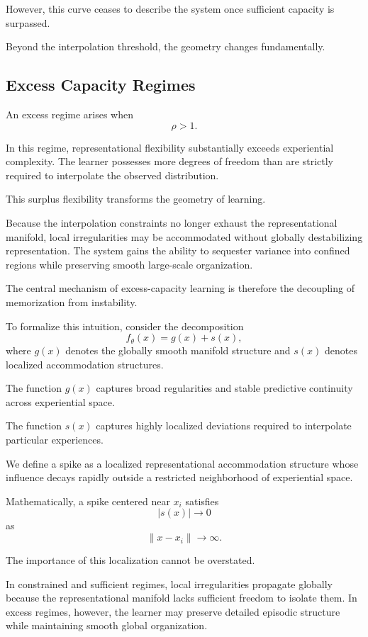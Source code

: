 \documentclass[12pt,a4paper]{article}
\begin{document}
However, this curve ceases to describe the system once sufficient capacity is surpassed.

Beyond the interpolation threshold, the geometry changes fundamentally.

\subsection{Excess Capacity Regimes}

An excess regime arises when
\[
\rho > 1.
\]

In this regime, representational flexibility substantially exceeds experiential complexity. The learner possesses more degrees of freedom than are strictly required to interpolate the observed distribution.

This surplus flexibility transforms the geometry of learning.

Because the interpolation constraints no longer exhaust the representational manifold, local irregularities may be accommodated without globally destabilizing representation. The system gains the ability to sequester variance into confined regions while preserving smooth large-scale organization.

The central mechanism of excess-capacity learning is therefore the decoupling of memorization from instability.

To formalize this intuition, consider the decomposition
\[
f_\theta(x) = g(x) + s(x),
\]
where \(g(x)\) denotes the globally smooth manifold structure and \(s(x)\) denotes localized accommodation structures.

The function \(g(x)\) captures broad regularities and stable predictive continuity across experiential space.

The function \(s(x)\) captures highly localized deviations required to interpolate particular experiences.

We define a spike as a localized representational accommodation structure whose influence decays rapidly outside a restricted neighborhood of experiential space.

Mathematically, a spike centered near \(x_i\) satisfies
\[
|s(x)| \to 0
\]
as
\[
\|x - x_i\| \to \infty.
\]

The importance of this localization cannot be overstated.

In constrained and sufficient regimes, local irregularities propagate globally because the representational manifold lacks sufficient freedom to isolate them. In excess regimes, however, the learner may preserve detailed episodic structure while maintaining smooth global organization.
\end{document}
